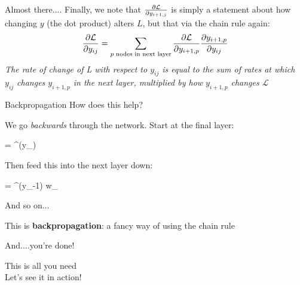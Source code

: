 \documentclass[]{SangerLibrary/sanger-present}
\begin{document}
	\begin{frame}{Almost there....}
		Finally, we note that $\frac{\partial \mathcal{L}}{\partial y_{i+1,j}}$ is simply a statement about how changing $y$ (the dot product) alters $L$, but that via the chain rule again:
		\begin{equation}
			\frac{\partial \mathcal{L}}{\partial y_{ij}} = \sum_{p \text{ nodes in next layer}} \frac{\partial \mathcal{L}}{\partial y_{i+1,p}} \frac{\partial y_{i+1,p}}{\partial y_{ij}}
		\end{equation}
		\pause \textit{The rate of change of L with respect to $y_{ij}$ is equal to the sum of rates at which $y_{ij}$ changes $y_{i+1,p}$ in the next layer, multiplied by how $y_{i+1,p}$ changes $\mathcal{L}$ }
	\end{frame}

	\begin{frame}{Backpropagation}
		\pause How does this help?

		\pause We go \textit{backwards} through the network. Start at the final layer:
		\begin{spalign}
			 = \phi^\prime(y_) 
		\end{spalign}
		
		\pause Then feed this into the next layer down:
		\begin{spalign}
			 = \phi^\prime(y_{-1})  w_\text{final,j}
		\end{spalign}

		\pause And so on...

		\pause This is \textbf{backpropagation}: a fancy way of using the chain rule
	\end{frame}

	\begin{frame}{And....you're done!}
		\begin{center}
			\LARGE
			This is all you need
			\\
			\pause Let's see it in action!
		\end{center}
	\end{frame}
\end{document}
